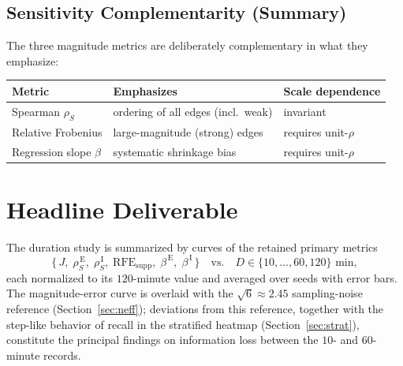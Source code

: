 \documentclass[11pt]{article}
\begin{document}
\subsection{Sensitivity Complementarity (Summary)}
The three magnitude metrics are deliberately complementary in what they
emphasize:
\begin{center}
\begin{tabular}{lll}
\toprule
Metric & Emphasizes & Scale dependence \\
\midrule
Spearman $\rho_S$ & ordering of all edges (incl.\ weak) & invariant \\
Relative Frobenius & large-magnitude (strong) edges & requires unit-$\rho$ \\
Regression slope $\beta$ & systematic shrinkage bias & requires unit-$\rho$ \\
\bottomrule
\end{tabular}
\end{center}

\section{Headline Deliverable}
\label{sec:deliverable}

The duration study is summarized by curves of the retained primary metrics
\begin{equation}
  \{\,J,\; \rho_S^{\,\mathrm{E}},\; \rho_S^{\,\mathrm{I}},\;
  \mathrm{RFE}_{\mathrm{supp}},\; \beta^{\,\mathrm{E}},\; \beta^{\,\mathrm{I}}\,\}
  \quad\text{vs.}\quad D\in\{10,\dots,60,120\}\text{ min},
\end{equation}
each normalized to its $120$-minute value and averaged over seeds with error
bars. The magnitude-error curve is overlaid with the
$\sqrt{6}\approx 2.45$ sampling-noise reference (Section~\ref{sec:neff});
deviations from this reference, together with the step-like behavior of recall
in the stratified heatmap (Section~\ref{sec:strat}), constitute the principal
findings on information loss between the $10$- and $60$-minute records.
\end{document}
